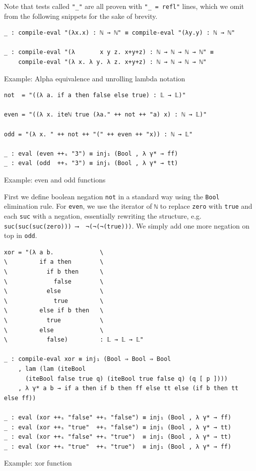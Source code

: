 Note that tests called \verb$"_"$ are all proven with \verb$"_ = refl"$ lines, which we omit from the following snippets for the sake of brevity.

\begin{listing}[H]
\begin{verbatim}
_ : compile-eval "(λx.x) : ℕ → ℕ" ≡ compile-eval "(λy.y) : ℕ → ℕ"

_ : compile-eval "(λ       x y z. x+y+z) : ℕ → ℕ → ℕ → ℕ" ≡
    compile-eval "(λ x. λ y. λ z. x+y+z) : ℕ → ℕ → ℕ → ℕ"
\end{verbatim}
\caption{Example: Alpha equivalence and unrolling lambda notation}
\label{code:examples-generic}
\end{listing}

\begin{listing}[H]
\begin{verbatim}
not  = "((λ a. if a then false else true) : 𝕃 → 𝕃)" 

even = "((λ x. iteℕ true (λa." ++ not ++ "a) x) : ℕ → 𝕃)"

odd = "(λ x. " ++ not ++ "(" ++ even ++ "x)) : ℕ → 𝕃"

_ : eval (even ++ₛ "3") ≡ inj₁ (Bool , λ γ* → ff)
_ : eval (odd  ++ₛ "3") ≡ inj₁ (Bool , λ γ* → tt)
\end{verbatim}
\caption{Example: even and odd functions}
\label{code:examples-evenodd}
\end{listing}

First we define boolean negation \verb$not$ in a standard way using the \verb$Bool$ elimination rule. For \verb$even$, we use the iterator of \verb$ℕ$ to replace \verb$zero$ with \verb$true$ and each \verb$suc$ with a negation, essentially rewriting the structure, e.g. \verb$suc(suc(suc(zero))) ⟶  ¬(¬(¬(true)))$. We simply add one more negation on top in \verb$odd$.

\begin{listing}[H]
\begin{verbatim}
xor = "(λ a b.             \
\         if a then        \
\           if b then      \
\             false        \
\           else           \
\             true         \
\         else if b then   \
\           true           \
\         else             \
\           false)         : 𝕃 → 𝕃 → 𝕃"

_ : compile-eval xor ≡ inj₁ (Bool ⇒ Bool ⇒ Bool
    , lam (lam (iteBool
      (iteBool false true q) (iteBool true false q) (q [ p ])))
    , λ γ* a b → if a then if b then ff else tt else (if b then tt else ff))

_ : eval (xor ++ₛ "false" ++ₛ "false") ≡ inj₁ (Bool , λ γ* → ff)
_ : eval (xor ++ₛ "true"  ++ₛ "false") ≡ inj₁ (Bool , λ γ* → tt)
_ : eval (xor ++ₛ "false" ++ₛ "true")  ≡ inj₁ (Bool , λ γ* → tt)
_ : eval (xor ++ₛ "true"  ++ₛ "true")  ≡ inj₁ (Bool , λ γ* → ff)
\end{verbatim}
\caption{Example: xor function}
\label{code:examples-xor}
\end{listing}

